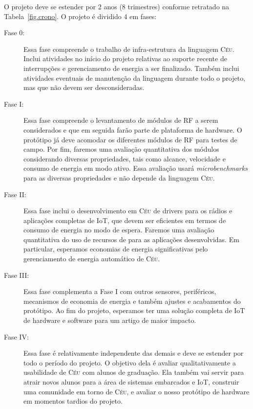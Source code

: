 \documentclass[titlepage,12pt]{article}
\newcommand{\CEU}{\textsc{C\'{e}u}\xspace}
\begin{document}
O projeto deve se estender por 2 anos (8 trimestres) conforme retratado na
Tabela~\ref{fig.crono}.
%
O projeto é dividido 4 em fases:
%
\begin{description}
\item[Fase 0:]
Essa fase compreende o trabalho de infra-estrutura da linguagem \CEU.
Inclui atividades no início do projeto relativas ao suporte recente de
interrupções e gerenciamento de energia a ser finalizado.
Também inclui atividades eventuais de manutenção da linguagem durante todo o
projeto, mas que não devem ser desconsideradas.
%
\item[Fase I:]
Essa fase compreende o levantamento de módulos de RF a serem considerados e
que em seguida farão parte de plataforma de hardware.
O protótipo já deve acomodar os diferentes módulos de RF para testes de campo.
Por fim, faremos uma avaliação quantitativa dos módulos considerando diversas
propriedades, tais como alcance, velocidade e consumo de energia em modo ativo.
Essa avaliação usará \emph{microbenchmarks} para as diversas propriedades e não
depende da linguagem \CEU.
%
\item[Fase II:]
Essa fase inclui o desenvolvimento em \CEU de drivers para os rádios e
aplicações completas de IoT, que devem ser eficientes em termos de consumo de
energia no modo de espera.
Faremos uma avaliação quantitativa do uso de recursos de para as aplicações
desenvolvidas.
Em particular, esperamos economias de energia significativas pelo gerenciamento
de energia automático de \CEU.
%
\item[Fase III:]
Essa fase complementa a Fase I com outros sensores, periféricos, mecanismos de
economia de energia e também ajustes e acabamentos do protótipo.
Ao fim do projeto, esperamos ter uma solução completa de IoT de hardware e
software para um artigo de maior impacto.
%
\item[Fase IV:]
Essa fase é relativamente independente das demais e deve se estender por todo o
período do projeto.
O objetivo dela é avaliar qualitativamente a usabilidade de \CEU com alunos de
graduação.
Ela também vai servir para atrair novos alunos para a área de sistemas
embarcados e IoT, construir uma comunidade em torno de \CEU, e avaliar o nosso
protótipo de hardware em momentos tardios do projeto.
\end{description}
\end{document}
